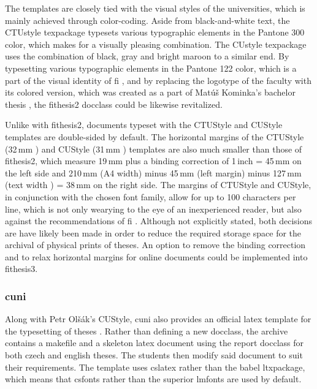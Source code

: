 \documentclass{article}
\begin{document}
  The templates are closely tied with the visual styles of the universities, which is mainly achieved through color-coding. Aside from black-and-white text, the CTUstyle \gls{texpackage} typesets various typographic elements in the  Pantone 300 color, which makes for a visually pleasing combination. The CUstyle \gls{texpackage} uses the combination of black, gray and  bright maroon to a similar end. By typesetting various typographic elements in the  Pantone 122 color, which is a part of the visual identity of \gls{fi} \cite{filogo}, and by replacing the logotype of the faculty with its colored version, which was created as a part of Matúš Kominka's bachelor thesis \cite{Kominka08}, the fithesis2 \gls{docclass} could be likewise revitalized. %

  Unlike with fithesis2, documents typeset with the CTUStyle and CUStyle templates are double-sided by default. The horizontal margins of the CTUStyle (32\,mm \cite[line 249]{ctustyleCode}) and CUStyle (31\,mm \cite[line 229]{custyleCode}) templates are also much smaller than those of fithesis2, which measure 19\,mm \cite[lines 968\nobreakdash--976]{fithesis2Code} plus a binding correction of 1\,inch \cite{latexlayout} = 45\,mm on the left side and 210\,mm (A4 width) minus 45\,mm (left margin) minus 127\,mm (text width \cite[lines~989, 1017, 1045]{fithesis2Code}) = 38\,mm on the right side. The margins of CTUStyle and CUStyle, in conjunction with the chosen font family, allow for up to 100 characters per line, which is not only wearying to the eye of an inexperienced reader, but also against the recommendations of \gls{fi} \cite[section 3.2.3]{bpdpfi}. Although not explicitly stated, both decisions are have likely been made in order to reduce the required storage space for the archival of physical prints of theses. An option to remove the binding correction and to relax horizontal margins for online documents could be implemented into fithesis3.

  \subsubsection{\Acrlong{cuni}}
  Along with Petr Olšák's CUStyle, \gls{cuni} also provides an official \gls{latex} template for the typesetting of theses \cite{cunisablona}. Rather than defining a new \gls{docclass}, the archive contains a \gls{makefile} and a skeleton \gls{latex} document using the report \gls{docclass} for both czech and english theses. The students then modify said document to suit their requirements. The template uses \gls{cslatex} rather than the babel \gls{ltxpackage}, which means that \gls{csfonts} rather than the superior \gls{lmfonts} \cite{cslatexvsbabel} are used by default.
\end{document}
